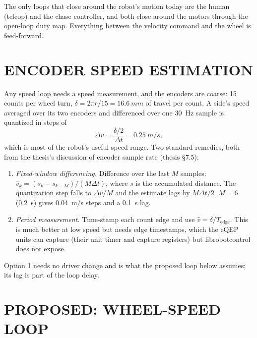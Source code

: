 The only loops that close around the robot's motion today are the human
(teleop) and the chase controller, and both close around the motors through
the open-loop duty map. Everything between the velocity command and the
wheel is feed-forward.

\section{ENCODER SPEED ESTIMATION}
\label{sec:speedest}

Any speed loop needs a speed measurement, and the encoders are coarse: 15
counts per wheel turn, $\delta=2\pi r/15=\SI{16.6}{mm}$ of travel per count.
A side's speed averaged over its two encoders and differenced over one
\SI{30}{Hz} sample is quantized in steps of
\begin{equation}
\Delta v = \frac{\delta/2}{\Delta t} = \SI{0.25}{m/s},
\end{equation}
which is most of the robot's useful speed range. Two standard remedies, both
from the thesis's discussion of encoder sample rate (thesis \S7.5):
\begin{enumerate}
\item \emph{Fixed-window differencing.} Difference over the last $M$
  samples: $\hat v_k = (s_k-s_{k-M})/(M\Delta t)$, where $s$ is the
  accumulated distance. The quantization step falls to $\Delta v/M$ and the
  estimate lags by $M\Delta t/2$. $M=6$ (\SI{0.2}{s}) gives \SI{0.04}{m/s}
  steps and a \SI{0.1}{s} lag.
\item \emph{Period measurement.} Time-stamp each count edge and use
  $\hat v=\delta/T_{\mathrm{edge}}$. This is much better at low speed but
  needs edge timestamps, which the eQEP units can capture (their unit timer
  and capture registers) but librobotcontrol does not expose.
\end{enumerate}
Option 1 needs no driver change and is what the proposed loop below
assumes; its lag is part of the loop delay.

\section{PROPOSED: WHEEL-SPEED LOOP}
\label{sec:speedloop}

